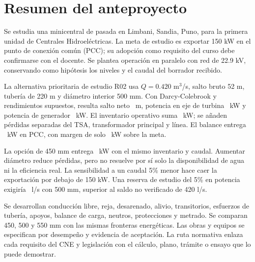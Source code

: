 \documentclass[11pt,letterpaper]{report}
\begin{document}
\hypersetup{pageanchor=false}

\hypersetup{pageanchor=true}
\chapter*{Resumen del anteproyecto}
Se estudia una minicentral de pasada en Limbani, Sandia, Puno, para la primera unidad de Centrales Hidroeléctricas. La meta de estudio es exportar 150 kW en el punto de conexión común (PCC); su adopción como requisito del curso debe confirmarse con el docente. Se plantea operación en paralelo con red de 22.9 kV, conservando como hipótesis los niveles y el caudal del borrador recibido.

La alternativa prioritaria de estudio R02 usa $Q=0.420$ m$^3$/s, salto bruto 52 m, tubería de 220 m y diámetro interior 500 mm. Con Darcy-Colebrook y rendimientos supuestos, resulta salto neto \HnAlt\ m, potencia en eje de turbina \PtAlt\ kW y potencia de generador \PeAlt\ kW. El inventario operativo suma \PAuxNormal\ kW; se añaden pérdidas separadas del TSA, transformador principal y línea. El balance entrega \PExport\ kW en PCC, con margen de solo \MargenExport\ kW sobre la meta.

La opción de 450 mm entrega \PExportRef\ kW con el mismo inventario y caudal. Aumentar diámetro reduce pérdidas, pero no resuelve por sí solo la disponibilidad de agua ni la eficiencia real. La sensibilidad a un caudal 5\% menor hace caer la exportación por debajo de 150 kW. Una reserva de estudio del 5\% en potencia exigiría \QMargen\ l/s con 500 mm, superior al saldo no verificado de 420 l/s.

Se desarrollan conducción libre, reja, desarenado, alivio, transitorios, esfuerzos de tubería, apoyos, balance de carga, neutros, protecciones y metrado. Se comparan 450, 500 y 550 mm con las mismas fronteras energéticas. Las obras y equipos se especifican por desempeño y evidencia de aceptación. La ruta normativa enlaza cada requisito del CNE y legislación con el cálculo, plano, trámite o ensayo que lo puede demostrar.

\end{document}
